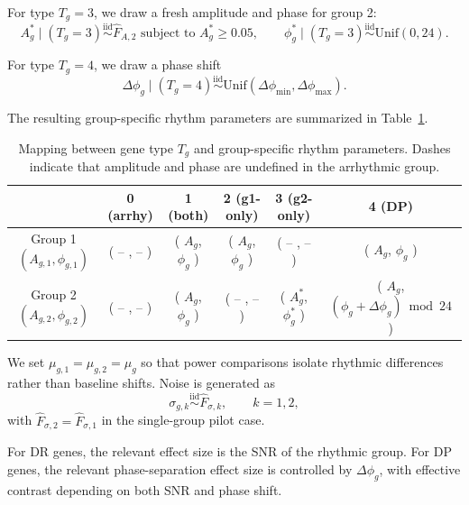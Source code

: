 \documentclass{article}
\begin{document}
For type $T_g=3$, we draw a fresh amplitude and phase for group 2:
\begin{equation}
A_g^* \mid (T_g=3)\overset{\mathrm{iid}}{\sim}\hat{F}_{A,2}
\text{ subject to }A_g^*\geq 0.05,
\qquad
\phi_g^* \mid (T_g=3)\overset{\mathrm{iid}}{\sim}\mathrm{Unif}(0,24).
\label{eq:layer3a}
\end{equation}


For type $T_g=4$, we draw a phase shift
\begin{equation}
\Delta\phi_g\mid(T_g=4)\overset{\mathrm{iid}}{\sim}
\mathrm{Unif}(\Delta\phi_{\min},\Delta\phi_{\max}).
\label{eq:layer3b}
\end{equation}


The resulting group-specific rhythm parameters are summarized in
Table~\ref{tab:type_mapping}.

\begin{table}[H]
\centering
\small
\begin{tabular}{c|ccccc}
\toprule
 & 0 (arrhy) & 1 (both) & 2 (g1-only) & 3 (g2-only) & 4 (DP) \\
\midrule
Group 1 $(A_{g,1},\phi_{g,1})$
& ( -- , -- )
& ( $A_g$, $\phi_g$ )
& ( $A_g$, $\phi_g$ )
& ( -- , -- )
& ( $A_g$, $\phi_g$ ) \\

Group 2 $(A_{g,2},\phi_{g,2})$
& ( -- , -- )
& ( $A_g$, $\phi_g$ )
& ( -- , -- )
& ( $A_g^*$, $\phi_g^*$ )
& ( $A_g$, $(\phi_g+\Delta\phi_g)\bmod 24$ ) \\
\bottomrule
\end{tabular}
\caption{Mapping between gene type $T_g$ and group-specific rhythm parameters.
Dashes indicate that amplitude and phase are undefined in the arrhythmic group.}
\label{tab:type_mapping}
\end{table}

We set $\mu_{g,1}=\mu_{g,2}=\mu_g$ so that power comparisons isolate rhythmic
differences rather than baseline shifts. Noise is generated as
\begin{equation}
\sigma_{g,k}\overset{\mathrm{iid}}{\sim}\hat{F}_{\sigma,k},
\qquad k=1,2,
\label{eq:noise_gen}
\end{equation}
with $\hat{F}_{\sigma,2}=\hat{F}_{\sigma,1}$ in the single-group pilot case.

For DR genes, the relevant effect size is the SNR of the rhythmic group. For
DP genes, the relevant phase-separation effect size is controlled by
$\Delta\phi_g$, with effective contrast depending on both SNR and phase shift.
\end{document}
